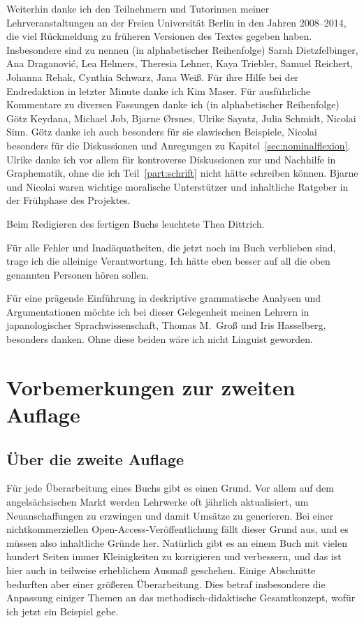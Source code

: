 Weiterhin danke ich den Teilnehmern und Tutorinnen meiner Lehrveranstaltungen an der Freien Universität Berlin in den Jahren 2008--2014, die viel Rückmeldung zu früheren Versionen des Textes gegeben haben.
Insbesondere sind zu nennen (in alphabetischer Reihenfolge) Sarah Dietzfelbinger, Ana Draganovi\'{c}, Lea Helmers, Theresia Lehner, Kaya Triebler, Samuel Reichert, Johanna Rehak, Cynthia Schwarz, Jana Weiß.
Für ihre Hilfe bei der Endredaktion in letzter Minute danke ich Kim Maser.
Für ausführliche Kommentare zu diversen Fassungen danke ich (in alphabetischer Reihenfolge) Götz Keydana, Michael Job, Bjarne Ørsnes, Ulrike Sayatz, Julia Schmidt, Nicolai Sinn.
Götz danke ich auch besonders für sie slawischen Beispiele, Nicolai besonders für die Diskussionen und Anregungen zu Kapitel~\ref{sec:nominalflexion}.
Ulrike danke ich vor allem für kontroverse Diskussionen zur und Nachhilfe in Graphematik, ohne die ich Teil~\ref{part:schrift} nicht hätte schreiben können.
Bjarne und Nicolai waren wichtige moralische Unterstützer und inhaltliche Ratgeber in der Frühphase des Projektes.

Beim Redigieren des fertigen Buchs leuchtete Thea Dittrich.

Für alle Fehler und Inadäquatheiten, die jetzt noch im Buch verblieben sind, trage ich die alleinige Verantwortung.
Ich hätte eben besser auf all die oben genannten Personen hören sollen.

Für eine prägende Einführung in deskriptive grammatische Analysen und Argumentationen möchte ich bei dieser Gelegenheit meinen Lehrern in japanologischer Sprachwissenschaft, Thomas M.\ Groß und Iris Hasselberg, besonders danken.
Ohne diese beiden wäre ich nicht Linguist geworden.


\chapter*{Vorbemerkungen zur zweiten Auflage}

\section*{Über die zweite Auflage}

Für jede Überarbeitung eines Buchs gibt es einen Grund.
Vor allem auf dem angelsächsischen Markt werden Lehrwerke oft jährlich aktualisiert, um Neuanschaffungen zu erzwingen und damit Umsätze zu generieren.
Bei einer nichtkommerziellen Open-Access-Veröffentlichung fällt dieser Grund aus, und es müssen also inhaltliche Gründe her.
Natürlich gibt es an einem Buch mit vielen hundert Seiten immer Kleinigkeiten zu korrigieren und verbessern, und das ist hier auch in teilweise erheblichem Ausmaß geschehen.
Einige Abschnitte bedurften aber einer größeren Überarbeitung.
Dies betraf insbesondere die Anpassung einiger Themen an das methodisch-didaktische Gesamtkonzept, wofür ich jetzt ein Beispiel gebe.

